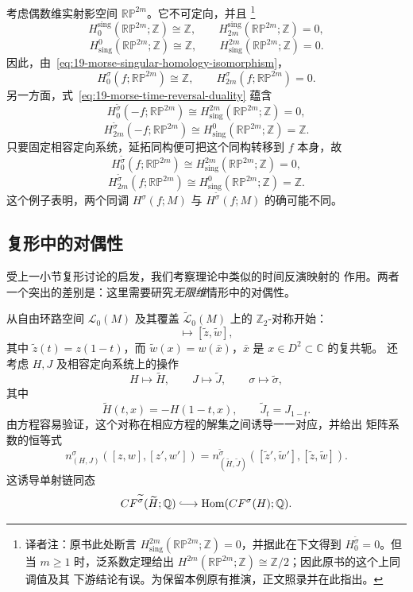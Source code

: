 \begin{example}
\label{ex:even-real-projective-space-orientations}
考虑偶数维实射影空间 $\mathbb{RP}^{2m}$。它不可定向，并且
\footnote{译者注：原书此处断言
$H_{\mathrm{sing}}^{2m}(\mathbb{RP}^{2m};\mathbb Z)=0$，并据此在下文得到
$H_0^{\widetilde\sigma}=0$。但当 $m\geq1$ 时，泛系数定理给出
$H^{2m}(\mathbb{RP}^{2m};\mathbb Z)\cong\mathbb Z/2$；因此原书的这个上同调值及其
下游结论有误。为保留本例原有推演，正文照录并在此指出。}
\[
 H_0^{\mathrm{sing}}(\mathbb{RP}^{2m};\mathbb Z)\cong\mathbb Z,
 \qquad H_{2m}^{\mathrm{sing}}(\mathbb{RP}^{2m};\mathbb Z)=0,
\]
\[
H_{\mathrm{sing}}^0(\mathbb{RP}^{2m};\mathbb Z)\cong\mathbb Z,
 \qquad H_{\mathrm{sing}}^{2m}(\mathbb{RP}^{2m};\mathbb Z)=0.
\]
因此，由~\eqref{eq:19-morse-singular-homology-isomorphism}，
\[
 H_0^\sigma(f;\mathbb{RP}^{2m})\cong\mathbb Z,
 \qquad H_{2m}^\sigma(f;\mathbb{RP}^{2m})=0.
\]
另一方面，式~\eqref{eq:19-morse-time-reversal-duality} 蕴含
\[
 H_0^{\widetilde\sigma}(-f;\mathbb{RP}^{2m})
 \cong H_{\mathrm{sing}}^{2m}(\mathbb{RP}^{2m};\mathbb Z)=0,
\]
\[
 H_{2m}^{\widetilde\sigma}(-f;\mathbb{RP}^{2m})
 \cong H_{\mathrm{sing}}^0(\mathbb{RP}^{2m};\mathbb Z)=\mathbb Z.
\]
只要固定相容定向系统，延拓同构便可把这个同构转移到 $f$ 本身，故
\[
 H_0^{\widetilde\sigma}(f;\mathbb{RP}^{2m})
 \cong H_{\mathrm{sing}}^{2m}(\mathbb{RP}^{2m};\mathbb Z)=0,
\]
\[
 H_{2m}^{\widetilde\sigma}(f;\mathbb{RP}^{2m})
 \cong H_{\mathrm{sing}}^0(\mathbb{RP}^{2m};\mathbb Z)=\mathbb Z.
\]
这个例子表明，两个\personMorse{}同调 $H^\sigma(f;M)$ 与
$H^{\widetilde\sigma}(f;M)$ 的确可能不同。
\end{example}

\subsection{\personFloer{}复形中的对偶性}
\label{subsec:duality-floer-complex}

受上一小节\personMorse{}复形讨论的启发，我们考察\personFloer{}理论中类似的时间反演映射的
作用。两者一个突出的差别是：这里需要研究\emph{无限维}情形中的对偶性。

从自由环路空间 $\mathcal L_0(M)$ 及其\personNovikov{}覆盖
$\widetilde{\mathcal L}_0(M)$ 上的 $\mathbb Z_2$-对称开始：
\begin{equation}
 [z,w]\longmapsto[\widetilde z,\widetilde w],
\label{eq:19-loop-time-reversal-involution}
\end{equation}
其中 $\widetilde z(t)=z(1-t)$，而
$\widetilde w(x)=w(\bar x)$，$\bar x$ 是 $x\in D^2\subset\mathbb C$ 的复共轭。
还考虑 $H,J$ 及相容定向系统上的操作
\[
 H\longmapsto\widetilde H,\qquad
 J\longmapsto\widetilde J,\qquad
 \sigma\longmapsto\widetilde\sigma,
\]
其中
\[
 \widetilde H(t,x)=-H(1-t,x),\qquad \widetilde J_t=J_{1-t}.
\]
由\personFloer{}方程容易验证，这个对称在相应\personFloer{}方程的解集之间诱导一一对应，并给出
矩阵系数的恒等式
\[
 n_{(H,J)}^\sigma([z,w],[z',w'])
 =n_{(\widetilde H,\widetilde J)}^{\widetilde\sigma}
 ([\widetilde z',\widetilde w'],[\widetilde z,\widetilde w]).
\]
这诱导单射链同态
\[
 CF^{\widetilde\sigma}(\widetilde H;\mathbb Q)
 \lhook\joinrel\longrightarrow
 \operatorname{Hom}(CF^\sigma(H);\mathbb Q).
\]

